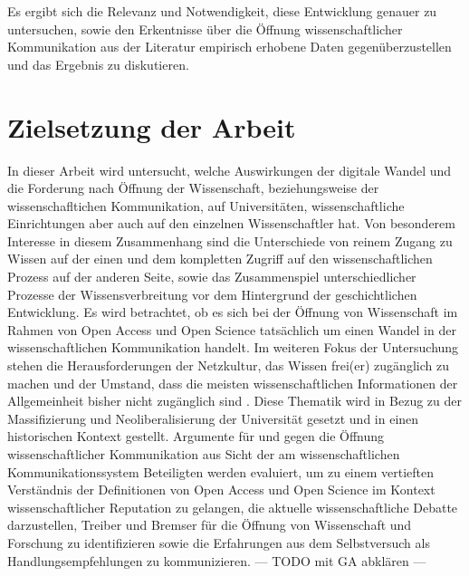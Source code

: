 Es ergibt sich die Relevanz und Notwendigkeit, diese Entwicklung genauer zu untersuchen, sowie den Erkentnisse über die Öffnung wissenschaftlicher Kommunikation aus der Literatur empirisch erhobene Daten gegenüberzustellen und das Ergebnis zu diskutieren.

\section{Zielsetzung der Arbeit}

In dieser Arbeit wird untersucht, welche Auswirkungen der digitale Wandel und die Forderung nach Öffnung der Wissenschaft, beziehungsweise der wissenschafltichen Kommunikation, auf Universitäten, wissenschaftliche Einrichtungen aber auch auf den einzelnen Wissenschaftler hat. Von besonderem Interesse in diesem Zusammenhang sind die Unterschiede von reinem Zugang zu Wissen auf der einen und dem kompletten Zugriff auf den wissenschaftlichen Prozess auf der anderen Seite, sowie das Zusammenspiel unterschiedlicher Prozesse der Wissensverbreitung vor dem Hintergrund der geschichtlichen Entwicklung. Es wird betrachtet, ob es sich bei der Öffnung von Wissenschaft im Rahmen von Open Access und Open Science tatsächlich um einen Wandel in der wissenschaftlichen Kommunikation handelt. Im weiteren Fokus der Untersuchung stehen die Herausforderungen der Netzkultur, das Wissen frei(er) zugänglich zu machen und der Umstand, dass die meisten wissenschaftlichen Informationen der Allgemeinheit bisher nicht zugänglich sind \cite{cite:6}. Diese Thematik wird in Bezug zu der Massifizierung und Neoliberalisierung der Universität gesetzt und in einen historischen Kontext gestellt. Argumente für und gegen die Öffnung wissenschaftlicher Kommunikation aus Sicht der am wissenschaftlichen Kommunikationssystem Beteiligten werden evaluiert, um zu einem vertieften Verständnis der Definitionen von Open Access und Open Science im Kontext wissenschaftlicher Reputation zu gelangen, die aktuelle wissenschaftliche Debatte darzustellen, Treiber und Bremser für die Öffnung von Wissenschaft und Forschung zu identifizieren sowie die Erfahrungen aus dem Selbstversuch als Handlungsempfehlungen zu kommunizieren. --- TODO mit GA abklären ---

